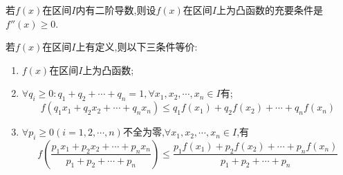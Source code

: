 \begin{corollary}
	若$f\left( x \right) $在区间$I$内有二阶导数,则设$f\left( x \right) $在区间$I$上为凸函数的充要条件是$f''\left( x \right) \ge 0$.
\end{corollary}

\begin{theorem}
	若$f\left( x \right) $在区间$I$上有定义,则以下三条件等价:
	\begin{enumerate}
		\item $f\left( x \right) $在区间$I$上为凸函数;
		\item $\forall q_i\ge 0:q_1+q_2+\cdots +q_n=1,\forall x_1,x_2,\cdots ,x_n\in I$有;
		      $$
			      f\left( q_1x_1+q_2x_2+\cdots +q_nx_n \right) \le q_1f\left( x_1 \right) +q_2f\left( x_2 \right) +\cdots +q_nf\left( x_n \right)
		      $$
		\item $\forall p_i\ge 0\left( i=1,2,\cdots ,n \right) $不全为零,$\forall x_1,x_2,\cdots ,x_n\in I$,有
		      $$
			      f\left( \frac{p_1x_1+p_2x_2+\cdots +p_nx_n}{p_1+p_2+\cdots +p_n} \right) \le \frac{p_1f\left( x_1 \right) +p_2f\left( x_2 \right) +\cdots +p_nf\left( x_n \right)}{p_1+p_2+\cdots +p_n}
		      $$
	\end{enumerate}
\end{theorem}
